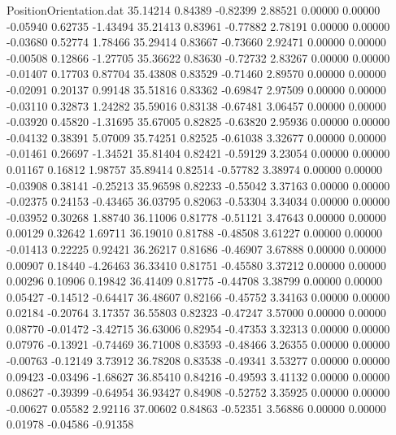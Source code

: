\begin{filecontents}{PositionOrientation.dat}
  35.14214    0.84389   -0.82399     2.88521    0.00000    0.00000   -0.05940    0.62735   -1.43494
  35.21413    0.83961   -0.77882     2.78191    0.00000    0.00000   -0.03680    0.52774    1.78466
  35.29414    0.83667   -0.73660     2.92471    0.00000    0.00000   -0.00508    0.12866   -1.27705
  35.36622    0.83630   -0.72732     2.83267    0.00000    0.00000   -0.01407    0.17703    0.87704
  35.43808    0.83529   -0.71460     2.89570    0.00000    0.00000   -0.02091    0.20137    0.99148
  35.51816    0.83362   -0.69847     2.97509    0.00000    0.00000   -0.03110    0.32873    1.24282
  35.59016    0.83138   -0.67481     3.06457    0.00000    0.00000   -0.03920    0.45820   -1.31695
  35.67005    0.82825   -0.63820     2.95936    0.00000    0.00000   -0.04132    0.38391    5.07009
  35.74251    0.82525   -0.61038     3.32677    0.00000    0.00000   -0.01461    0.26697   -1.34521
  35.81404    0.82421   -0.59129     3.23054    0.00000    0.00000    0.01167    0.16812    1.98757
  35.89414    0.82514   -0.57782     3.38974    0.00000    0.00000   -0.03908    0.38141   -0.25213
  35.96598    0.82233   -0.55042     3.37163    0.00000    0.00000   -0.02375    0.24153   -0.43465
  36.03795    0.82063   -0.53304     3.34034    0.00000    0.00000   -0.03952    0.30268    1.88740
  36.11006    0.81778   -0.51121     3.47643    0.00000    0.00000    0.00129    0.32642    1.69711
  36.19010    0.81788   -0.48508     3.61227    0.00000    0.00000   -0.01413    0.22225    0.92421
  36.26217    0.81686   -0.46907     3.67888    0.00000    0.00000    0.00907    0.18440   -4.26463
  36.33410    0.81751   -0.45580     3.37212    0.00000    0.00000    0.00296    0.10906    0.19842
  36.41409    0.81775   -0.44708     3.38799    0.00000    0.00000    0.05427   -0.14512   -0.64417
  36.48607    0.82166   -0.45752     3.34163    0.00000    0.00000    0.02184   -0.20764    3.17357
  36.55803    0.82323   -0.47247     3.57000    0.00000    0.00000    0.08770   -0.01472   -3.42715
  36.63006    0.82954   -0.47353     3.32313    0.00000    0.00000    0.07976   -0.13921   -0.74469
  36.71008    0.83593   -0.48466     3.26355    0.00000    0.00000   -0.00763   -0.12149    3.73912
  36.78208    0.83538   -0.49341     3.53277    0.00000    0.00000    0.09423   -0.03496   -1.68627
  36.85410    0.84216   -0.49593     3.41132    0.00000    0.00000    0.08627   -0.39399   -0.64954
  36.93427    0.84908   -0.52752     3.35925    0.00000    0.00000   -0.00627    0.05582    2.92116
  37.00602    0.84863   -0.52351     3.56886    0.00000    0.00000    0.01978   -0.04586   -0.91358

\end{filecontents}
